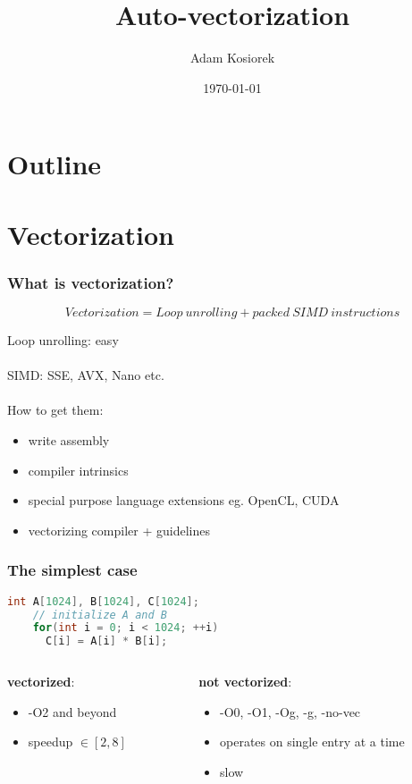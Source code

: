 \documentclass{beamer}
\title{Auto-vectorization}
\author{Adam Kosiorek}
\date {\today}
\begin{document}
\frame{\titlepage}

\section*{Outline}
\frame{\tableofcontents}

\section{Vectorization}

\frame{ 
}

\begin{frame}[fragile]
  \frametitle{What is vectorization?}

  \begin{equation}
    Vectorization = {Loop\ unrolling} + {packed\ SIMD\ instructions}  
  \end{equation}
  
  Loop unrolling: easy \\\ \\
  SIMD: SSE, AVX, Nano etc. \\\ \\
  How to get them:
  \begin{itemize}
   \item write assembly
   \item compiler intrinsics
   \item special purpose language extensions eg. OpenCL, CUDA
   \item vectorizing compiler + guidelines
  \end{itemize}
\end{frame}

\begin{frame}[fragile]
  \frametitle{The simplest case}
  
  \begin{lstlisting}[language=C++]
    int A[1024], B[1024], C[1024];
    // initialize A and B
    for(int i = 0; i < 1024; ++i) 
      C[i] = A[i] * B[i];   
  \end{lstlisting}
  
  \begin{columns}[onlytextwidth]
    \begin{column}{0.4\textwidth}
     \textbf{vectorized}:
     \begin{itemize}
      \item -O2 and beyond
      \item speedup $\in [2, 8]$
     \end{itemize}
    \end{column}
    
    \begin{column}{0.4\textwidth}
     \textbf{not vectorized}:
     \begin{itemize}
      \item -O0, -O1, -Og, -g, -no-vec
      \item operates on single entry at a time
      \item slow
     \end{itemize}
    \end{column}
  \end{columns}
  
\end{frame}
\end{document}
